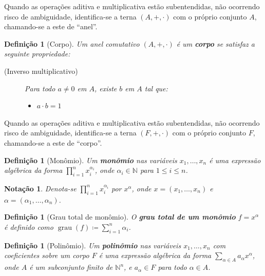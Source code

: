 \documentclass[12pt,a4paper]{report}
\newcommand{\N}{\mathbb{N}}
\newtheorem{definition}[theorem]{Definição}
\newtheorem*{notation}{Notação}
\numberwithin{theorem}{chapter}
\DeclareMathOperator{\grau}{grau}
\begin{document}
Quando as operações aditiva e multiplicativa estão subentendidas, não
ocorrendo risco de ambiguidade, identifica-se a terna \((A,+,\cdot)\)
com o próprio conjunto \(A\), chamando-se a este de ``anel''.

\begin{definition}[Corpo]
  Um anel comutativo \((A,+,\cdot)\) é um \textbf{corpo} se satisfaz a
  seguinte propriedade:
  \begin{description}
  \item[(Inverso multiplicativo)] Para todo \(a \neq 0\) em \(A\),
    existe \(b\) em \(A\) tal que:
    \begin{itemize}
    \item \(a \cdot b = 1\)
    \end{itemize}
  \end{description}
\end{definition}

Quando as operações aditiva e multiplicativa estão subentendidas, não
ocorrendo risco de ambiguidade, identifica-se a terna \((F,+,\cdot)\)
com o próprio conjunto \(F\), chamando-se a este de ``corpo''.

\begin{definition}[Monômio]
  Um \textbf{monômio} nas variáveis \(x_1,\ldots,x_n\) é uma expressão
  algébrica da forma \(\prod\limits_{i=1}^n{x_i^{\alpha_i}}\), onde
  \(\alpha_i \in \N\) para \(1 \leq i \leq n\).
\end{definition}

\begin{notation}
  Denota-se \(\prod\limits_{i=1}^n{x_i^{\alpha_i}}\) por \(x^\alpha\),
  onde \(x = (x_1,\ldots,x_n)\) e \(\alpha =
  (\alpha_1,\ldots,\alpha_n)\).
\end{notation}

\begin{definition}[Grau total de monômio]
  O \textbf{grau total de um monômio} \(f = x^\alpha\) é definido como
  \({\grau(f) \coloneqq \sum\limits_{i=1}^n{\alpha_i}}\).
\end{definition}

\begin{definition}[Polinômio]
  Um \textbf{polinômio} nas variáveis \(x_1,\ldots,x_n\) com
  coeficientes sobre um corpo \(F\) é uma expressão algébrica da forma
  \(\sum\limits_{\alpha \in A} a_{\alpha}x^\alpha\), onde \(A\) é um
  subconjunto finito de \(\N^n\), e \(a_{\alpha} \in F\) para todo
  \(\alpha \in A\).
\end{definition}
\end{document}

